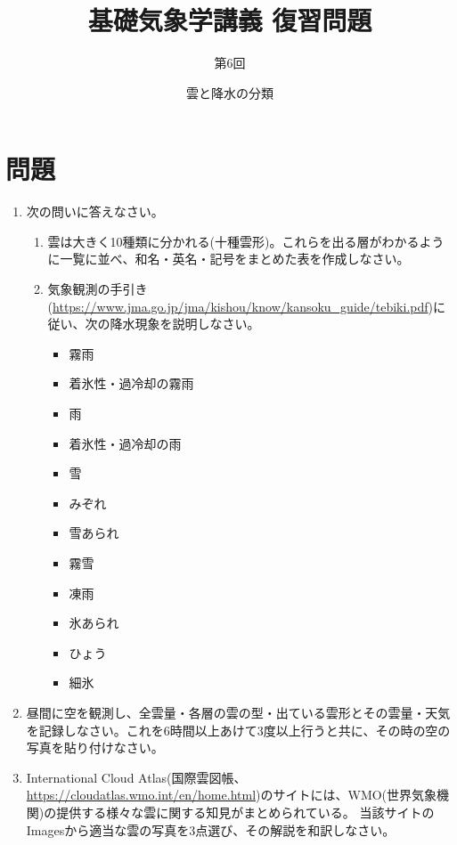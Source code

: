 \documentclass{jsarticle}
\newenvironment{problems}
{
  \renewcommand\labelenumi{\doublebox{\arabic{enumi}}}
  \begin{enumerate}
}{
  \end{enumerate}
  \renewcommand\labelenumi{\arabic{enumi}.}
}
\begin{document}
\title{基礎気象学講義 復習問題} %
\author{第6回} %
\date{雲と降水の分類} %
\maketitle

\section{問題}

    \begin{problems}
    \item 次の問いに答えなさい。
        \begin{enumerate}[(1)]
        \item 雲は大きく10種類に分かれる(十種雲形)。これらを出る層がわかるように一覧に並べ、和名・英名・記号をまとめた表を作成しなさい。
        \item 気象観測の手引き(\url{https://www.jma.go.jp/jma/kishou/know/kansoku_guide/tebiki.pdf})に従い、次の降水現象を説明しなさい。
        \begin{itemize}
            \item 霧雨
            \item 着氷性・過冷却の霧雨
            \item 雨
            \item 着氷性・過冷却の雨
            \item 雪
            \item みぞれ
            \item 雪あられ
            \item 霧雪
            \item 凍雨
            \item 氷あられ
            \item ひょう
            \item 細氷\\
        \end{itemize}
        \end{enumerate}

    \item 昼間に空を観測し、全雲量・各層の雲の型・出ている雲形とその雲量・天気を記録しなさい。これを6時間以上あけて3度以上行うと共に、その時の空の写真を貼り付けなさい。\\

    \item International Cloud Atlas(国際雲図帳、\url{https://cloudatlas.wmo.int/en/home.html})のサイトには、WMO(世界気象機関)の提供する様々な雲に関する知見がまとめられている。
        当該サイトのImagesから適当な雲の写真を3点選び、その解説を和訳しなさい。

\end{problems}
\end{document}
